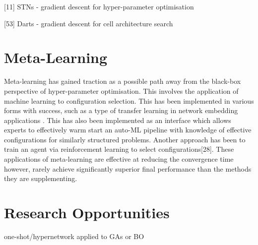 \documentclass{article}
\begin{document}
[11] STNs - gradient descent for hyper-parameter optimisation

[53] Darts - gradient descent for cell architecture search  
    


\section{Meta-Learning}

Meta-learning has gained traction as a possible path away from the black-box perspective of hyper-parameter optimisation. This involves the application of machine learning to configuration selection. This has been implemented in various forms with success, such as a type of transfer learning in network embedding applications \cite{9}. This has also been implemented as an interface which allows experts to effectively warm start an auto-ML pipeline with knowledge of effective configurations for similarly structured problems\cite{29}. Another approach has been to train an agent via reinforcement learning to select configurations[28]. These applications of meta-learning are effective at reducing the convergence time however, rarely achieve significantly superior final performance than the methods they are supplementing.\cite{31}\cite{29}

\section{Research Opportunities}

one-shot/hypernetwork applied to GAs or BO

\printbibliography[

heading=bibintoc,
title={Whole bibliography}

]
\end{document}
